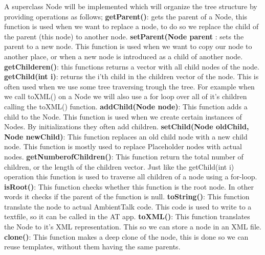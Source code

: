 \documentclass[a4paper,12pt]{report}
\begin{document}
A superclass Node will be implemented which will organize the tree structure by providing operations as follows;
\newline\textbf{getParent()}: gets the parent of a Node, this function is used when we want to replace a node, to do so we replace the child of the parent (this node) to another node.
\newline\textbf{setParent(Node parent} : sets the parent to a new node. This function is used when we want to copy our node to another place, or when a new node is introduced as a child of another node.
\newline\textbf{getChilderen()}:  this functions returns a vector with all child nodes of the node. 
\newline\textbf{getChild(int i)}: returns the i'th child in the children vector of the node. This is often used when we use some tree traversing trough the tree. For example when we call toXML() on a Node we will also 
use a for loop over all of it's children calling the toXML() function.
\newline\textbf{addChild(Node node)}: This function adds a child to the Node. This function is used when we create certain instances of Nodes. By initializations they often add children.
\newline\textbf{setChild(Node oldChild, Node newChild)}: This function replaces an old child node with a new child node. This function is mostly used to replace Placeholder nodes with actual nodes.
\newline\textbf{getNumberofChildren()}: This function return the total number of children, or the length of the children vector. Just like the getChild(int i) operation this function is used to traverse all children of a node
using a for-loop.
\newline\textbf{isRoot()}: This function checks whether this function is the root node. In other words it checks if the parent of the function is null.
\newline\textbf{toString()}: This function translate the node to actual AmbientTalk code. This code is used to write to a textfile, so it can be called in the AT app.
\newline\textbf{toXML()}: This function translates the Node to it's XML representation. This so we can store a node in an XML file.
\newline\textbf{clone()}: This function makes a deep clone of the node, this is done so we can reuse templates, without them having the same parents.
\newline
\end{document}
